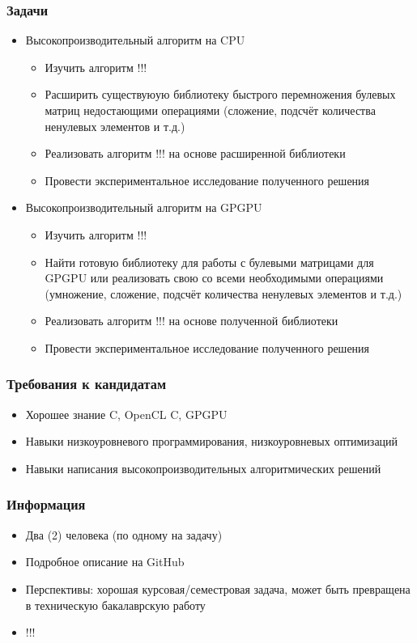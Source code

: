 \documentclass{beamer}
\begin{document}
\begin{frame}[fragile]
\transwipe[direction=90]
\frametitle{Задачи}
  \begin{itemize}
    \item Высокопроизводительный алгоритм на CPU
    \begin{itemize}
       \item Изучить алгоритм !!!
       \item Расширить существуюую библиотеку быстрого перемножения булевых матриц недостающими 
       операциями (сложение, подсчёт количества ненулевых элементов и т.д.)
       \item Реализовать алгоритм !!! на основе расширенной библиотеки
       \item Провести экспериментальное исследование полученного решения
    \end{itemize}
    \item Высокопроизводительный алгоритм на GPGPU
    \begin{itemize}
       \item Изучить алгоритм !!!
       \item Найти готовую библиотеку для работы с булевыми матрицами для GPGPU или реализовать 
       свою со всеми необходимыми операциями (умножение, сложение, подсчёт количества ненулевых элементов и т.д.)
       \item Реализовать алгоритм !!! на основе полученной библиотеки
       \item Провести экспериментальное исследование полученного решения
    \end{itemize}

  \end{itemize}  
\end{frame}

\begin{frame}[fragile]
\transwipe[direction=90]
\frametitle{Требования к кандидатам}
  \begin{itemize}
    \item Хорошее знание C, OpenCL C, GPGPU
    \item Навыки низкоуровневого программирования, низкоуровневых оптимизаций
    \item Навыки написания высокопроизводительных алгоритмических решений
  \end{itemize}  
\end{frame}

\begin{frame}[fragile]
\transwipe[direction=90]
\frametitle{Информация}
  \begin{itemize}
    \item Два (2) человека (по одному на задачу)
    \item Подробное описание на GitHub
    \item Перспективы: хорошая курсовая/семестровая задача, может быть превращена в техническую бакалаврскую работу 
    \item !!!
  \end{itemize}  
\end{frame}
\end{document}
